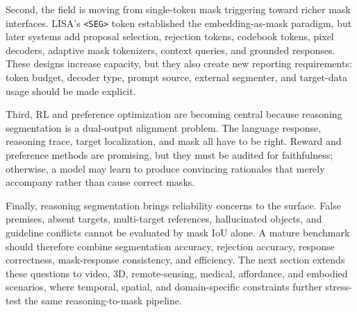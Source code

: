 Second, the field is moving from single-token mask triggering toward richer mask interfaces. LISA's \texttt{<SEG>} token established the embedding-as-mask paradigm, but later systems add proposal selection, rejection tokens, codebook tokens, pixel decoders, adaptive mask tokenizers, context queries, and grounded responses. These designs increase capacity, but they also create new reporting requirements: token budget, decoder type, prompt source, external segmenter, and target-data usage should be made explicit.

Third, RL and preference optimization are becoming central because reasoning segmentation is a dual-output alignment problem. The language response, reasoning trace, target localization, and mask all have to be right. Reward and preference methods are promising, but they must be audited for faithfulness; otherwise, a model may learn to produce convincing rationales that merely accompany rather than cause correct masks.

Finally, reasoning segmentation brings reliability concerns to the surface. False premises, absent targets, multi-target references, hallucinated objects, and guideline conflicts cannot be evaluated by mask IoU alone. A mature benchmark should therefore combine segmentation accuracy, rejection accuracy, response correctness, mask-response consistency, and efficiency. The next section extends these questions to video, 3D, remote-sensing, medical, affordance, and embodied scenarios, where temporal, spatial, and domain-specific constraints further stress-test the same reasoning-to-mask pipeline.
